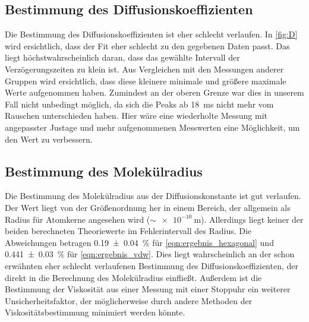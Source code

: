 \subsection{Bestimmung des Diffusionskoeffizienten}
Die Bestimmung des Diffusionskoeffizienten ist eher schlecht verlaufen. In
\autoref{fig:D} wird ersichtlich, dass der Fit eher schlecht zu den gegebenen
Daten passt. Das liegt höchstwahrscheinlich daran, dass das gewählte Intervall
der Verzögerungszeiten zu klein ist. Aus Vergleichen mit den Messungen anderer
Gruppen wird ersichtlich, dass diese kleinere minimale und größere maximale
Werte aufgenommen haben. Zumindest an der oberen Grenze war dies in unserem Fall
nicht unbedingt möglich, da sich die Peaks ab \SI{18}{\ms} nicht mehr vom
Rauschen unterschieden haben. Hier wäre eine wiederholte Messung mit angepasster
Justage und mehr aufgenommenen Messwerten eine Möglichkeit, um den Wert zu
verbessern.

\subsection{Bestimmung des Molekülradius}
Die Bestimmung des Molekülradius aus der Diffusionskonstante ist gut verlaufen.
Der Wert liegt von der Größenordnung her in einem Bereich, der allgemein als
Radius für Atomkerne angesehen wird ($\sim \SI{e-10}{\m}$). Allerdings liegt
keiner der beiden berechneten Theoriewerte im Fehlerintervall des Radius. Die
Abweichungen betragen \SI{0.19(4)}{\percent} für \eqref{eqn:ergebnis_hexagonal}
und \SI{0.441(30)}{\percent} für \eqref{eqn:ergebnis_vdw}. Dies liegt
wahrscheinlich an der schon erwähnten eher schlecht verlaufenen Bestimmung des
Diffusionskoeffizienten, der direkt in die Berechnung des Molekülradius
einfließt. Außerdem ist die Bestimmung der Viskosität aus einer Messung mit
einer Stoppuhr ein weiterer Unsicherheitsfaktor, der möglicherweise durch andere
Methoden der Viskositätsbestimmung minimiert werden könnte.
